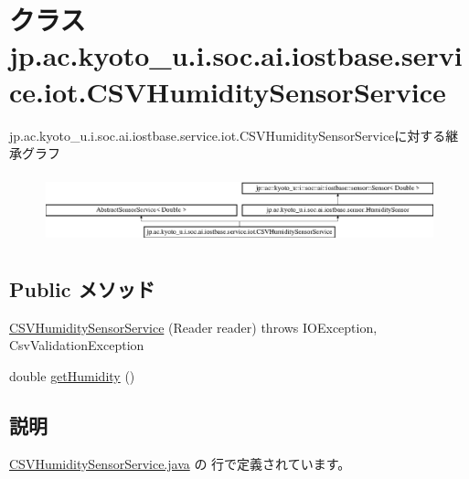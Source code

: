 \hypertarget{classjp_1_1ac_1_1kyoto__u_1_1i_1_1soc_1_1ai_1_1iostbase_1_1service_1_1iot_1_1_c_s_v_humidity_sensor_service}{\section{クラス jp.\-ac.\-kyoto\-\_\-u.\-i.\-soc.\-ai.\-iostbase.\-service.\-iot.\-C\-S\-V\-Humidity\-Sensor\-Service}
\label{classjp_1_1ac_1_1kyoto__u_1_1i_1_1soc_1_1ai_1_1iostbase_1_1service_1_1iot_1_1_c_s_v_humidity_sensor_service}
}
jp.\-ac.\-kyoto\-\_\-u.\-i.\-soc.\-ai.\-iostbase.\-service.\-iot.\-C\-S\-V\-Humidity\-Sensor\-Serviceに対する継承グラフ\begin{figure}[H]
\begin{center}
\leavevmode
\includegraphics[height=2.019231cm]{classjp_1_1ac_1_1kyoto__u_1_1i_1_1soc_1_1ai_1_1iostbase_1_1service_1_1iot_1_1_c_s_v_humidity_sensor_service}
\end{center}
\end{figure}
\subsection*{Public メソッド}
\begin{DoxyCompactItemize}
\item 
\hyperlink{classjp_1_1ac_1_1kyoto__u_1_1i_1_1soc_1_1ai_1_1iostbase_1_1service_1_1iot_1_1_c_s_v_humidity_sensor_service_a1108aad7b41f7c6371261d14373f4404}{C\-S\-V\-Humidity\-Sensor\-Service} (Reader reader)  throws I\-O\-Exception, Csv\-Validation\-Exception 
\item 
double \hyperlink{classjp_1_1ac_1_1kyoto__u_1_1i_1_1soc_1_1ai_1_1iostbase_1_1service_1_1iot_1_1_c_s_v_humidity_sensor_service_ab29f262805a0a16f1cdd585838f243f9}{get\-Humidity} ()
\end{DoxyCompactItemize}


\subsection{説明}


 \hyperlink{_c_s_v_humidity_sensor_service_8java_source}{C\-S\-V\-Humidity\-Sensor\-Service.\-java} の  行で定義されています。




